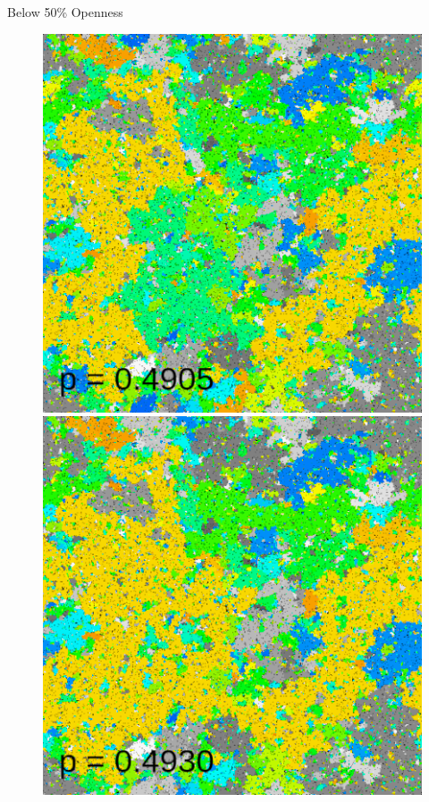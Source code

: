 \documentclass[aspectratio=169, handout]{beamer}
\begin{document}
\begin{frame}{Below 50\% Openness}
\begin{figure}
\includegraphics[scale=0.22]{percolation-gif/percolation-1-55.png}
\includegraphics[scale=0.22]{percolation-gif/percolation-1-60.png}
\end{figure}
\end{frame}
\end{document}
